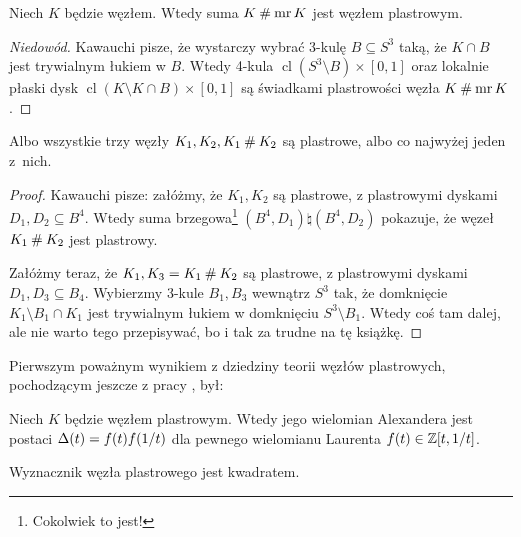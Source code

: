 \begin{proposition}
    Niech $K$ będzie węzłem.
    Wtedy suma $K \mathbin{\#} \operatorname{mr} K$ jest węzłem plastrowym.
\end{proposition}

\begin{proof}[Niedowód]
    Kawauchi \cite[s. 155]{kawauchi1996} pisze, że wystarczy wybrać 3-kulę $B \subseteq S^3$ taką, że $K \cap B$ jest trywialnym łukiem w $B$.
    Wtedy 4-kula $\operatorname{cl} (S^3 \setminus B) \times [0,1]$ oraz lokalnie płaski dysk $\operatorname{cl} (K \setminus K \cap B) \times [0,1] $ są świadkami plastrowości węzła $K \mathbin{\#} \operatorname{mr} K$.
\end{proof}

\begin{proposition}
    Albo wszystkie trzy węzły $K_1, K_2, K_1 \mathbin{\#} K_2$ są plastrowe, albo co najwyżej jeden z~nich.
\end{proposition}

\begin{proof}
    Kawauchi \cite[s. 155]{kawauchi1996} pisze: załóżmy, że $K_1, K_2$ są plastrowe, z plastrowymi dyskami $D_1, D_2 \subseteq B^4$.
    Wtedy suma brzegowa\footnote{Cokolwiek to jest!} $(B^4, D_1) \natural (B^4, D_2)$ pokazuje, że węzeł $K_1 \mathbin{\#} K_2$ jest plastrowy.

    Załóżmy teraz, że $K_1, K_3 = K_1 \mathbin{\#} K_2$ są plastrowe, z plastrowymi dyskami $D_1, D_3 \subseteq B_4$.
    Wybierzmy 3-kule $B_1, B_3$ wewnątrz $S^3$ tak, że domknięcie $K_1 \setminus B_1 \cap K_1$ jest trywialnym łukiem w domknięciu $S^3 \setminus B_1$.
    Wtedy coś tam dalej, ale nie warto tego przepisywać, bo i tak za trudne na tę książkę.
\end{proof}

Pierwszym poważnym wynikiem z dziedziny teorii węzłów plastrowych, pochodzącym jeszcze z pracy \cite{fox1966}, był:

\begin{proposition}
%
    Niech $K$ będzie węzłem plastrowym.
    Wtedy jego wielomian Alexandera jest postaci $\Delta(t) = f(t) f(1/t)$ dla pewnego wielomianu Laurenta $f(t) \in \mathbb Z[t, 1/t]$.
\end{proposition}

\begin{corollary}
    \label{det_slice_square}%
    Wyznacznik węzła plastrowego jest kwadratem.
\end{corollary}

